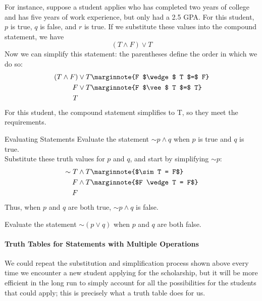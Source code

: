 For instance, suppose a student applies who has completed two years of college and has five years of work experience, but only had a 2.5 GPA.  For this student, $p$ is true, $q$ is false, and $r$ is true.  If we substitute these values into the compound statement, we have
\[(T \wedge F) \vee T\]
Now we can simplify this statement: the parentheses define the order in which we do so:
\begin{align*}
(T \wedge F) &\vee T\marginnote{F $\wedge$ T $=$ F}\\
F &\vee T\marginnote{F $\vee$ T $=$ T}\\
T
\end{align*}
For this student, the compound statement simplifies to T, so they meet the requirements.

\begin{example}[https://www.youtube.com/watch?v=TbDIeFHMS00]{Evaluating Statements}
Evaluate the statement $\sim p \wedge q$ when $p$ is true and $q$ is true.\\

\sol
Substitute these truth values for $p$ and $q$, and start by simplifying $\sim p$:
\begin{align*}
\sim T &\wedge T\marginnote{$\sim T = F$}\\
F &\wedge T\marginnote{$F \wedge T = F$}\\
F
\end{align*}
Thus, when $p$ and $q$ are both true, $\sim p \wedge q$ is false.
\end{example}

\begin{try}
Evaluate the statement $\sim (p \vee q)$ when $p$ and $q$ are both false.
\end{try}

\paragraph{Truth Tables for Statements with Multiple Operations}
We could repeat the substitution and simplification process shown above every time we encounter a new student applying for the scholarship, but it will be more efficient in the long run to simply account for all the possibilities for the students that could apply; this is precisely what a truth table does for us.

